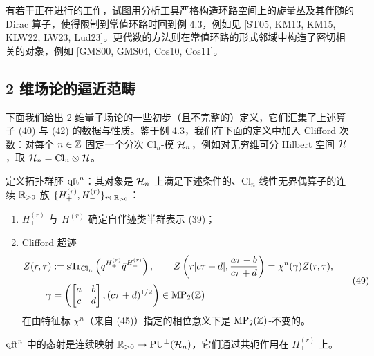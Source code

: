 

\begin{remark}[4.5]
有若干正在进行的工作，试图用分析工具严格构造环路空间上的旋量丛及其伴随的 Dirac 算子，使得限制到常值环路时回到例 4.3，例如见 [ST05, KM13, KM15, KLW22, LW23, Lud23]。更代数的方法则在常值环路的形式邻域中构造了密切相关的对象，例如 [GMS00, GMS04, Cos10, Cos11]。
\end{remark}

\subsection{2 维场论的逼近范畴}

下面我们给出 2 维量子场论的一些初步（且不完整的）定义，它们汇集了上述算子 (40) 与 (42) 的数据与性质。鉴于例 4.3，我们在下面的定义中加入 Clifford 次数：对每个 $n\in\mathbb{Z}$ 固定一个分次 $\mathrm{Cl}_n$-模 $\mathcal{H}_n$，例如对无穷维可分 Hilbert 空间 $\mathcal{H}$，取 $\mathcal{H}_n=\mathrm{Cl}_n\otimes\mathcal{H}$。

\begin{definition}[4.6]
定义拓扑群胚 $\operatorname{qft}^n$：其对象是 $\mathcal{H}_n$ 上满足下述条件的、$\mathrm{Cl}_n$-线性无界偶算子的连续 $\mathbb{R}_{>0}$-族 $\{H^{(r)}_+,H^{(r)}_-\}_{r\in\mathbb{R}_{>0}}$：
\begin{enumerate}[label=(\roman*)]
  \item $H^{(r)}_+$ 与 $H^{(r)}_-$ 确定自伴迹类半群表示 (39)；
  \item Clifford 超迹
  \begin{equation}
  \begin{aligned}
  Z(r,\tau)&:=\mathrm{sTr}_{\mathrm{Cl}_n}\left(q^{H^{(r)}_+}\bar q^{H^{(r)}_-}\right),\qquad Z\left(r|c\tau+d|,\frac{a\tau+b}{c\tau+d}\right)=\chi^n(\gamma)Z(r,\tau),\\[2pt]
  \gamma&=\left(\begin{bmatrix}a&b\\c&d\end{bmatrix},(c\tau+d)^{1/2}\right)\in\operatorname{MP}_2(\mathbb{Z})
  \end{aligned}
  \tag{49}
  \end{equation}
  在由特征标 $\chi^n$（来自 (45)）指定的相位意义下是 $\operatorname{MP}_2(\mathbb{Z})$-不变的。
\end{enumerate}
$\operatorname{qft}^n$ 中的态射是连续映射 $\mathbb{R}_{>0}\to\mathrm{PU}^\pm(\mathcal{H}_n)$，它们通过共轭作用在 $H^{(r)}_\pm$ 上。
\end{definition}

